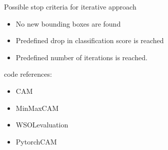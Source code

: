 Possible stop criteria for iterative approach
\begin{itemize}
    \item No new bounding boxes are found
    \item Predefined drop in classification score is reached
    \item Predefined number of iterations is reached.
\end{itemize}

code references:
\begin{itemize}
    \item CAM \cite{code:CAM}
    \item MinMaxCAM \cite{code:MinMaxCAM}
    \item WSOLevaluation\cite{code:WSOLevaluation}
    \item PytorchCAM \cite{code:PytorchCAM}
\end{itemize}
